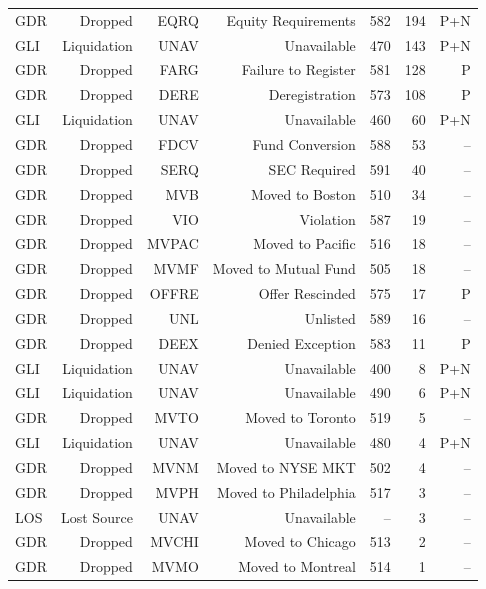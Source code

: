 \begin{table}
\begin{tabular}{lrrrrrr}
GDR & Dropped & EQRQ & Equity Requirements & 582 & 194 & P+N \\
GLI & Liquidation & UNAV & Unavailable & 470 & 143 & P+N \\
GDR & Dropped & FARG & Failure to Register & 581 & 128 & P \\
GDR & Dropped & DERE & Deregistration & 573 & 108 & P \\
GLI & Liquidation & UNAV & Unavailable & 460 & 60 & P+N \\
GDR & Dropped & FDCV & Fund Conversion & 588 & 53 & -- \\
GDR & Dropped & SERQ & SEC Required & 591 & 40 & -- \\
GDR & Dropped & MVB & Moved to Boston & 510 & 34 & -- \\
GDR & Dropped & VIO & Violation & 587 & 19 & -- \\
GDR & Dropped & MVPAC & Moved to Pacific & 516 & 18 & -- \\
GDR & Dropped & MVMF & Moved to Mutual Fund & 505 & 18 & -- \\
GDR & Dropped & OFFRE & Offer Rescinded & 575 & 17 & P \\
GDR & Dropped & UNL & Unlisted & 589 & 16 & -- \\
GDR & Dropped & DEEX & Denied Exception & 583 & 11 & P \\
GLI & Liquidation & UNAV & Unavailable & 400 & 8 & P+N \\
GLI & Liquidation & UNAV & Unavailable & 490 & 6 & P+N \\
GDR & Dropped & MVTO & Moved to Toronto & 519 & 5 & -- \\
GLI & Liquidation & UNAV & Unavailable & 480 & 4 & P+N \\
GDR & Dropped & MVNM & Moved to NYSE MKT & 502 & 4 & -- \\
GDR & Dropped & MVPH & Moved to Philadelphia & 517 & 3 & -- \\
LOS & Lost Source & UNAV & Unavailable & -- & 3 & -- \\
GDR & Dropped & MVCHI & Moved to Chicago & 513 & 2 & -- \\
GDR & Dropped & MVMO & Moved to Montreal & 514 & 1 & -- \\
\bottomrule
\end{tabular}
\end{table}
